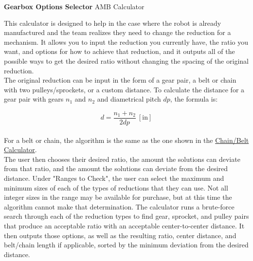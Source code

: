 \documentclass[a4paper]{article}
\begin{document}
	
	\Huge\textbf{Gearbox Options Selector}
	\newline
	\LARGE AMB Calculator
	
	\vspace{0.5cm}
	\normalsize
	
	This calculator is designed to help in the case where the robot is already manufactured and the team realizes they need to change the reduction for a mechanism. It allows you to input the reduction you currently have, the ratio you want, and options for how to achieve that reduction, and it outputs all of the possible ways to get the desired ratio without changing the spacing of the original reduction.\\
	
	The original reduction can be input in the form of a gear pair, a belt or chain with two pulleys/sprockets, or a custom distance. To calculate the distance for a gear pair with gears $ n_1 $ and $ n_2 $ and diametrical pitch $ dp $, the formula is:
	
	\begin{equation}
		d = \frac{n_1 + n_2}{2 dp}\ [\text{in}]
	\end{equation}\\
	
	For a belt or chain, the algorithm is the same as the one shown in the \href{https://amb-calculator.netlify.app/docs/chain_belt.pdf}{Chain/Belt Calculator}.\\
	
	The user then chooses their desired ratio, the amount the solutions can deviate from that ratio, and the amount the solutions can deviate from the desired distance. Under "Ranges to Check", the user can select the maximum and minimum sizes of each of the types of reductions that they can use. Not all integer sizes in the range may be available for purchase, but at this time the algorithm cannot make that determination. The calculator runs a brute-force search through each of the reduction types to find gear, sprocket, and pulley pairs that produce an acceptable ratio with an acceptable center-to-center distance. It then outputs those options, as well as the resulting ratio, center distance, and belt/chain length if applicable, sorted by the minimum deviation from the desired distance. 
	
	
\end{document}
